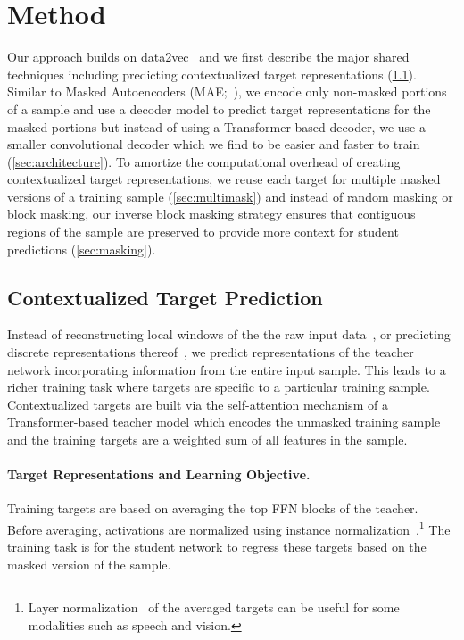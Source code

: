 \documentclass[nohyperref]{article}
\theoremstyle{plain}
\theoremstyle{definition}
\theoremstyle{remark}
\begin{document}
\section{Method}

Our approach builds on data2vec~\citep{baevski2022d2v} and we first describe the major shared techniques including predicting contextualized target representations (\textsection\ref{sec:d2v}).
Similar to Masked Autoencoders (MAE;~\citealt{he2021mae}), we encode only non-masked portions of a sample and use a decoder model to predict target representations for the masked portions but 
instead of using a Transformer-based decoder, we use a smaller convolutional decoder which we find to be easier and faster to train (\textsection\ref{sec:architecture}).
To amortize the computational overhead of creating contextualized target representations, we reuse each target for multiple masked versions of a training sample (\textsection\ref{sec:multimask}) and instead of random masking or block masking, our inverse block masking strategy ensures that contiguous regions of the sample are preserved to provide more context for student predictions (\textsection\ref{sec:masking}).


\subsection{Contextualized Target Prediction}
\label{sec:d2v}

Instead of reconstructing local windows of the the raw input data~\citep{he2021mae}, or predicting discrete representations thereof~\citep{bao2021beit}, we predict representations of the teacher network incorporating information from the entire input sample. 
This leads to a richer training task where targets are specific to a particular training sample.
Contextualized targets are built via the self-attention mechanism of a Transformer-based teacher model which encodes the unmasked training sample~\citep{paulus17intra,vaswani2017transformer} and the training targets are a weighted sum of all features in the sample.

\paragraph{Target Representations and Learning Objective.}
Training targets are based on averaging the top  FFN blocks of the teacher. 
Before averaging, activations are normalized using instance normalization~\citep{ulyanov2016in}.\footnote{Layer normalization~\citep{ba2016layer} of the averaged targets can be useful for some modalities such as speech and vision.}
The training task is for the student network to regress these targets based on the masked version of the sample.
\end{document}
